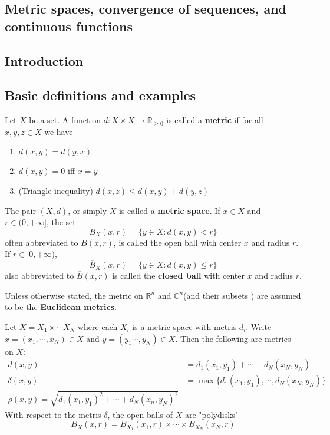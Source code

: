 \subsection{Metric spaces, convergence of sequences, and continuous functions}
\subsection{Introduction}
\subsection{Basic definitions and examples}
\begin{definition}
    Let  $ X  $ be a set. A function  $ d :X\times X\rightarrow \mathbb{R }_{ \geq 0} $ is called a \textbf{metric} if for all  $ x,y,z\in X  $ we have 
    \begin{enumerate}[$ (1) $]
        \item  $ d(x,y)=d(y,x) $ 
        \item  $ d(x,y)=0  $ iff  $ x=y  $ 
        \item (Triangle inequality) $ d(x,z) \leq d(x,y)+d(y,z) $
    \end{enumerate}
    The pair  $ (X,d) $, or simply  $ X  $ is called a \textbf{metric space}. If  $ x\in X  $ and  $ r\in(0,+\infty] $, the set 
    \[B_X(x,r)=\{y\in X :d(x,y)<r \}\]
    often abbreviated to  $ B(x,r) $, is called the open ball with center  $ x  $ and radius  $ r $. If  $ r\in [0,+\infty ) $, 
    \[\overline{B}_X(x,r)=\{y\in X :d(x,y) \leq r\}\]
    also abbreviated to  $ \overline{B }(x,r) $ is called the \textbf{closed ball} with center  $ x  $ and radius    $ r  $.   
\end{definition} 
Unless otherwise stated, the metric on  $ \mathbb{R }^n  $ and  $ \mathbb{C }^n  $(and their subsets ) are assumed to be the \textbf{Euclidean metrics}.
\begin{example}
    Let  $ X=X_1\times \cdots X_N  $ where each  $ X_i  $ is a metric space with metris  $ d_i $. Write  $ x=(x_1,\cdots,x_N )\in X  $ and  $ y=(y_1\cdots,y_N )\in X $. Then the following are metrics on  $ X  $:
    \begin{align}
        d(x,y)&=d_1(x_1,y_1)+\cdots+d_N(x_N,y_N)\\
        \delta(x,y)&=\max\{d_1(x_1,y_1),\cdots,d_N(x_N,y_N)\}\\
        \rho (x,y)=\sqrt{d_1(x_1,y_1)^2+\cdots+d_N(x_n,y_N)^2}
    \end{align}
    With respect to the metris  $ \delta  $, the open balls of  $ X  $ are "polydisks"
    \[B_X(x,r)=B_{X_1}(x_1,r)\times\cdots\times B_{X_N}(x_N, r)\] 
\end{example}
